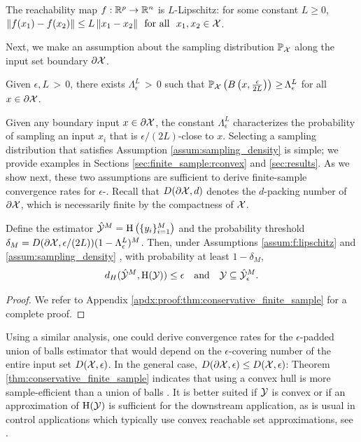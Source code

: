 \documentclass[12pt]{l4dc2022} %
\begin{document}
\begin{myassumption}\label{assum:f:lipschitz}
The reachability map $f:\mathbb{R}^p\rightarrow\mathbb{R}^n$ is $L$-Lipschitz: for some constant $L\geq 0$, 
% 
$\|f(x_1)-f(x_2)\|
\leq
L\,\|x_1-x_2\|\  \
\text{for all }\ x_1,x_2\in\mathcal{X}$.
% 
\end{myassumption}
Next, we make an assumption about the sampling distribution $\mathbb{P}_{\mathcal{X}}$ along the input set boundary $\partial\mathcal{X}$.



\begin{myassumption}\label{assum:sampling_density}
% 
% 
Given $\epsilon,L\,{>}\,0$, there exists $\Lambda_{\epsilon}^{L}\,{>}\,0$ such that $\mathbb{P}_{\mathcal{X}}\left(B\left(x,\frac{\epsilon}{2L}\right)\right)\,{\geq}\, \Lambda_{\epsilon}^{L}$ for all  
	$x\in\partial\mathcal{X}$.
\end{myassumption}
Given any boundary input $x\in\partial\mathcal{X}$, 
the constant $\Lambda_{\epsilon}^{L}$ characterizes the probability of sampling an input $x_i$ that is $\epsilon/(2L)$-close to $x$. 
Selecting a sampling distribution that satisfies Assumption \ref{assum:sampling_density} is simple; we provide examples in Sections \ref{sec:finite_sample:rconvex} and \ref{sec:results}. 
As we show next, these two assumptions are sufficient to derive finite-sample convergence rates for $\epsilon$-\randup. 
Recall that $D(\partial\mathcal{X}, d)$ denotes the $d$-packing number of $\partial\mathcal{X}$, which is necessarily finite by the compactness of $\mathcal{X}$. 



\begin{thm} \label{thm:conservative_finite_sample} 
Define the estimator $\hat{\mathcal{Y}}^M=\textrm{H}\left(\{y_i\}_{i{=}1}^M\right)$ and the probability threshold
$
\delta_M= 
D(\partial\mathcal{X},\epsilon/(2L))(1 -
	\Lambda_{\epsilon}^{L}
)^M
$.
% 
Then, under Assumptions \ref{assum:f:lipschitz} and \ref{assum:sampling_density} 
\rev{and assuming that $\partial\Y\subseteq f(\partial\X)$}, with probability at least $1-\delta_M$, 
$$
% 
d_H(
\hat\Y^M, 
\hull(\Y)
)\leq \epsilon
% 
\quad\text{and}\quad
% 
\Y\subseteq\hat\Y_\epsilon^M. 
% 
$$
\end{thm}
\begin{proof}
We refer to Appendix \ref{apdx:proof:thm:conservative_finite_sample} for a complete proof.
\end{proof}
% 
% 
% 
% 
Using a similar analysis, 
one could derive convergence rates for the $\epsilon$-padded union of balls estimator %
\citep{Devroye1980,Baillo2001} that would depend on the $\epsilon$-covering number of the entire input set $D(\mathcal{X},\epsilon)$. 
In the general case, %
$D(\partial\mathcal{X},\epsilon)\leq D(\mathcal{X},\epsilon)$: %
% 
Theorem \ref{thm:conservative_finite_sample} indicates that 
using a convex hull is more sample-efficient than a union of balls . It is better suited if $\mathcal{Y}$ is convex or if an approximation of $\textrm{H}(\mathcal{Y})$ is sufficient for the downstream application, as is usual in control applications which typically use convex reachable set approximations, see \citep{LewPavone2020}.  
\end{document}
